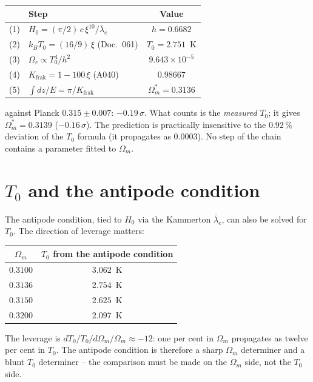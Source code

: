 \begin{center}
\begin{tabular}{clc}
\toprule
 & Step & Value \\
\midrule
(1) & $H_0 = (\pi/2)\,c\,\xi^{10}/\bar\lambda_e$ & $h = 0.6682$ \\
(2) & $k_BT_0 = (16/9)\,\xi$ (Doc.~061) & $T_0 = 2.751$~K \\
(3) & $\Omega_r \propto T_0^4/h^2$ & $9.643\times10^{-5}$ \\
(4) & $K_\text{frak} = 1-100\,\xi$ (A040) & $0.98667$ \\
(5) & $\int dz/E = \pi/K_\text{frak}$ &
  $\Omega_m^{*} = 0.3136$ \\
\bottomrule
\end{tabular}
\end{center}

\noindent against Planck $0.315 \pm 0.007$: $-0.19\,\sigma$.
What counts is the \emph{measured} $T_0$; it gives
$\Omega_m^{*} = 0.3139$ ($-0.16\,\sigma$). The prediction is
practically insensitive to the $0.92\,\%$ deviation of the $T_0$
formula (it propagates as $0.0003$). No step of the chain contains a parameter
fitted to $\Omega_m$.

\section{$T_0$ and the antipode condition}

The antipode condition, tied to $H_0$ via the Kammerton
$\bar\lambda_e$, can also be solved for $T_0$. The direction of
leverage matters:

\begin{center}
\begin{tabular}{cc}
\toprule
$\Omega_m$ & $T_0$ from the antipode condition \\
\midrule
$0.3100$ & $3.062$~K \\
$0.3136$ & $2.754$~K \\
$0.3150$ & $2.625$~K \\
$0.3200$ & $2.097$~K \\
\bottomrule
\end{tabular}
\end{center}

\noindent The leverage is $dT_0/T_0 \big/ d\Omega_m/\Omega_m
\approx -12$: one per cent in $\Omega_m$ propagates as twelve per
cent in $T_0$. The antipode condition is therefore a sharp
$\Omega_m$ determiner and a blunt $T_0$ determiner -- the comparison must be made on the
$\Omega_m$ side, not the $T_0$ side.

